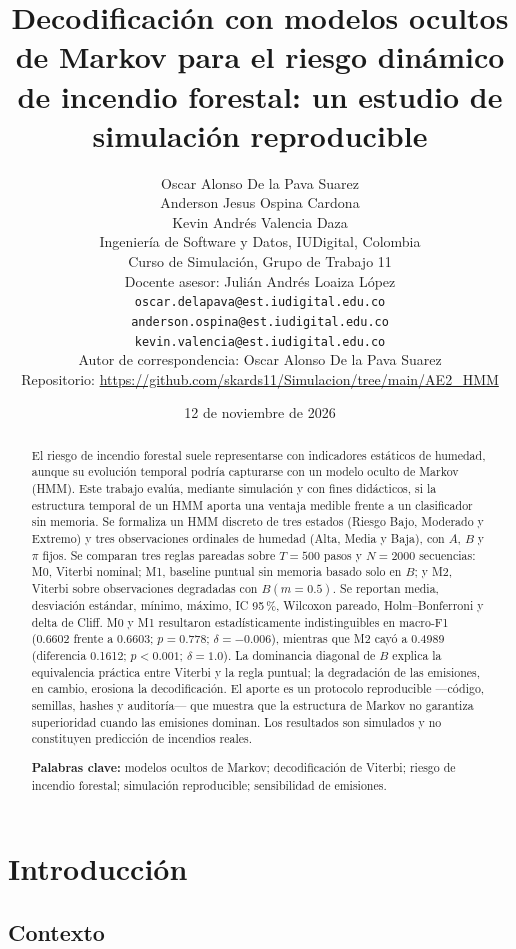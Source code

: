 \documentclass[11pt,letterpaper]{article}
\title{Decodificación con modelos ocultos de Markov para el riesgo dinámico de incendio forestal: un estudio de simulación reproducible}
\author{
Oscar Alonso De la Pava Suarez\\
Anderson Jesus Ospina Cardona\\
Kevin Andrés Valencia Daza\\[0.5em]
\small Ingeniería de Software y Datos, IUDigital, Colombia\\
\small Curso de Simulación, Grupo de Trabajo 11\\
\small Docente asesor: Julián Andrés Loaiza López\\
\small \texttt{oscar.delapava@est.iudigital.edu.co}\\
\small \texttt{anderson.ospina@est.iudigital.edu.co}\\
\small \texttt{kevin.valencia@est.iudigital.edu.co}\\
\small Autor de correspondencia: Oscar Alonso De la Pava Suarez\\
\small Repositorio: \url{https://github.com/skards11/Simulacion/tree/main/AE2_HMM}
}
\date{12 de noviembre de 2026}
\begin{document}
\maketitle

\begin{abstract}
\noindent
El riesgo de incendio forestal suele representarse con indicadores estáticos de humedad, aunque su evolución temporal podría capturarse con un modelo oculto de Markov (HMM). Este trabajo evalúa, mediante simulación y con fines didácticos, si la estructura temporal de un HMM aporta una ventaja medible frente a un clasificador sin memoria. Se formaliza un HMM discreto de tres estados (Riesgo Bajo, Moderado y Extremo) y tres observaciones ordinales de humedad (Alta, Media y Baja), con \(A\), \(B\) y \(\pi\) fijos. Se comparan tres reglas pareadas sobre \(T=500\) pasos y \(N=2000\) secuencias: M0, Viterbi nominal; M1, baseline puntual sin memoria basado solo en \(B\); y M2, Viterbi sobre observaciones degradadas con \(B(m=0.5)\). Se reportan media, desviación estándar, mínimo, máximo, IC 95\,\%, Wilcoxon pareado, Holm--Bonferroni y delta de Cliff. M0 y M1 resultaron estadísticamente indistinguibles en macro-F1 (0.6602 frente a 0.6603; \(p=0.778\); \(\delta=-0.006\)), mientras que M2 cayó a 0.4989 (diferencia 0.1612; \(p<0.001\); \(\delta=1.0\)). La dominancia diagonal de \(B\) explica la equivalencia práctica entre Viterbi y la regla puntual; la degradación de las emisiones, en cambio, erosiona la decodificación. El aporte es un protocolo reproducible ---código, semillas, hashes y auditoría--- que muestra que la estructura de Markov no garantiza superioridad cuando las emisiones dominan. Los resultados son simulados y no constituyen predicción de incendios reales.

\vspace{0.4em}
\noindent\textbf{Palabras clave:} modelos ocultos de Markov; decodificación de Viterbi; riesgo de incendio forestal; simulación reproducible; sensibilidad de emisiones.
\end{abstract}

\section{Introducción}

\subsection{Contexto}
\end{document}
